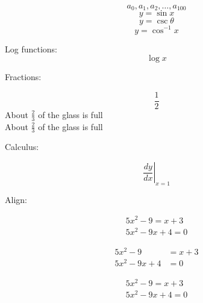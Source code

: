 \documentclass[12pt]{article}
\begin{document}
$${a_{0}, a_{1}, a_{2}, \ldots, a_{100}}$$
$${y=\sin{x}}$$
$${y=\csc{\theta}}$$
$${y=\cos^{-1}{x}}$$

Log functions:
$${\log{x}}$$

Fractions:

$${\frac{1}{2}}$$
About $\displaystyle \frac{2}{3}$ of the glass is full \\[12pt]
About $\frac{2}{3}$ of the glass is full

Calculus:

$$\left.\frac{dy}{dx}\right|_{x=1}$$

Align:

\begin{align}
 5x^2-9 = x+3 \\
 5x^2-9x+4 = 0
\end{align}

\begin{align*}
 5x^2-9 &= x+3 \\
 5x^2-9x+4 &= 0
\end{align*}

\begin{align}
  5x^2-9 = x+3 \\
  5x^2-9x+4 = 0
\end{align}
\end{document}
